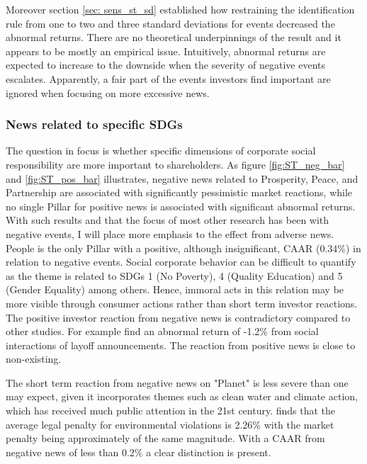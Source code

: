 Moreover section \ref{sec: sens_st_sd} established how restraining the identification rule from one to two and three standard deviations for events decreased the abnormal returns. There are no theoretical underpinnings of the result and it appears to be mostly an empirical issue. Intuitively, abnormal returns are expected to increase to the downside when the severity of negative events escalates. Apparently, a fair part of the events investors find important are ignored when focusing on more excessive news. 

\subsubsection{News related to specific SDGs}

The question in focus is whether specific dimensions of corporate social responsibility are more important to shareholders. As figure \ref{fig:ST_neg_bar} and \ref{fig:ST_pos_bar} illustrates, negative news related to Prosperity, Peace, and Partnership are associated with significantly pessimistic market reactions, while no single Pillar for positive news is associated with significant abnormal returns. With such results and that the focus of most other research has been with negative events, I will place more emphasis to the effect from adverse news. \\

People is the only Pillar with a positive, although insignificant, CAAR (0.34\%) in relation to negative events. Social corporate behavior can be difficult to quantify as the theme is related to SDGs 1 (No Poverty), 4 (Quality Education) and 5 (Gender Equality) among others. Hence, immoral acts in this relation may be more visible through consumer actions rather than short term investor reactions. The positive investor reaction from negative news is contradictory compared to other studies. For example \cite{chen2001layoffs} find an abnormal return of -1.2\% from social interactions of layoff announcements. The reaction from positive news is close to non-existing. 

The short term reaction from negative news on "Planet" is less severe than one may expect, given it incorporates themes such as clean water and climate action, which has received much public attention in the 21st century. \cite{karpoff2005reputational} finds that the average legal penalty for environmental violations is 2.26\% with the market penalty being approximately of the same magnitude. With a CAAR from negative news of less than 0.2\% a clear distinction is present. 

